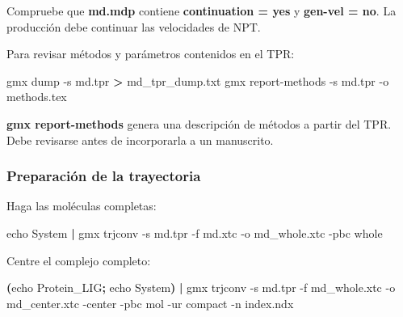\documentclass[
  spanish,
  11pt,
  a4paper]{article}
\newenvironment{Shaded}{\begin{snugshade}}{\end{snugshade}}
\newcommand{\AttributeTok}[1]{\textcolor[rgb]{0.13,0.29,0.53}{#1}}
\newcommand{\BuiltInTok}[1]{#1}
\newcommand{\ExtensionTok}[1]{#1}
\newcommand{\KeywordTok}[1]{\textcolor[rgb]{0.13,0.29,0.53}{\textbf{#1}}}
\newcommand{\NormalTok}[1]{#1}
\newcommand{\OperatorTok}[1]{\textcolor[rgb]{0.81,0.36,0.00}{\textbf{#1}}}
\begin{document}
Compruebe que \textbf{md.mdp} contiene \textbf{continuation = yes} y
\textbf{gen-vel = no}. La producción debe continuar las velocidades de
NPT.

Para revisar métodos y parámetros contenidos en el TPR:

\begin{Shaded}
\begin{Highlighting}[]
\ExtensionTok{gmx}\NormalTok{ dump }\AttributeTok{{-}s}\NormalTok{ md.tpr }\OperatorTok{\textgreater{}}\NormalTok{ md\_tpr\_dump.txt}
\ExtensionTok{gmx}\NormalTok{ report{-}methods }\AttributeTok{{-}s}\NormalTok{ md.tpr }\AttributeTok{{-}o}\NormalTok{ methods.tex}
\end{Highlighting}
\end{Shaded}

\textbf{gmx report-methods} genera una descripción de métodos a partir
del TPR. Debe revisarse antes de incorporarla a un manuscrito.

\subsubsection{Preparación de la
trayectoria}\label{preparaciuxf3n-de-la-trayectoria}

Haga las moléculas completas:

\begin{Shaded}
\begin{Highlighting}[]
\BuiltInTok{echo}\NormalTok{ System }\KeywordTok{|}
\ExtensionTok{gmx}\NormalTok{ trjconv     }\AttributeTok{{-}s}\NormalTok{ md.tpr     }\AttributeTok{{-}f}\NormalTok{ md.xtc     }\AttributeTok{{-}o}\NormalTok{ md\_whole.xtc     }\AttributeTok{{-}pbc}\NormalTok{ whole}
\end{Highlighting}
\end{Shaded}

Centre el complejo completo:

\begin{Shaded}
\begin{Highlighting}[]
\KeywordTok{(}\BuiltInTok{echo}\NormalTok{ Protein\_LIG}\KeywordTok{;} \BuiltInTok{echo}\NormalTok{ System}\KeywordTok{)} \KeywordTok{|}
\ExtensionTok{gmx}\NormalTok{ trjconv     }\AttributeTok{{-}s}\NormalTok{ md.tpr     }\AttributeTok{{-}f}\NormalTok{ md\_whole.xtc     }\AttributeTok{{-}o}\NormalTok{ md\_center.xtc     }\AttributeTok{{-}center}     \AttributeTok{{-}pbc}\NormalTok{ mol     }\AttributeTok{{-}ur}\NormalTok{ compact     }\AttributeTok{{-}n}\NormalTok{ index.ndx}
\end{Highlighting}
\end{Shaded}
\end{document}
